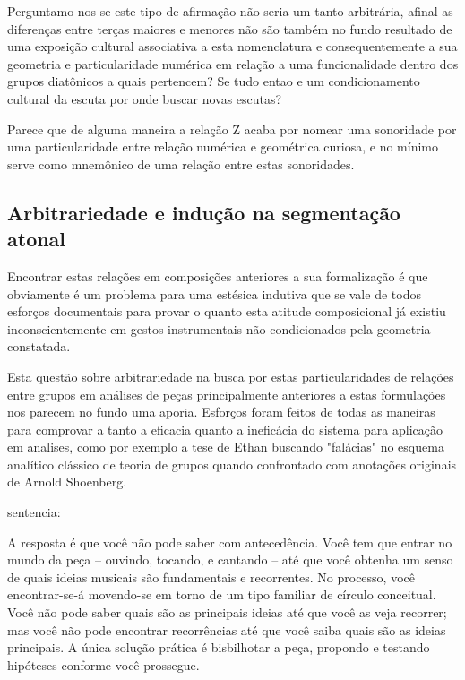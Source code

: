 \documentclass[
	12pt,				%
	openright,			%
	twoside,			%
	a4paper,			%
	english,			%
	french,				%
	spanish,			%
	brazil				%
	]{abntex2}
\begin{document}
Perguntamo-nos se este tipo de afirmação não seria um tanto arbitrária, afinal as diferenças entre terças maiores e menores não são também no fundo resultado de uma exposição cultural associativa a esta nomenclatura e consequentemente a sua geometria e particularidade numérica em relação a uma funcionalidade dentro dos grupos diatônicos a quais pertencem? Se tudo entao e um condicionamento cultural da escuta por onde buscar novas escutas?

Parece que de alguma maneira a relação Z acaba por nomear uma sonoridade por uma particularidade entre relação numérica e geométrica curiosa, e no mínimo serve como mnemônico de uma relação entre estas sonoridades.

\subsection{Arbitrariedade e indução  na segmentação atonal}

Encontrar estas relações em composições anteriores a sua formalização é que obviamente é um problema para uma estésica indutiva\cite{nattiez2001tripartite} que se vale de todos esforços documentais para provar o quanto esta atitude composicional já existiu inconscientemente em gestos instrumentais não condicionados pela geometria constatada.


Esta questão sobre arbitrariedade na busca por estas particularidades de relações entre grupos em análises de peças principalmente anteriores a estas formulações nos parecem no fundo uma aporia. Esforços foram feitos de todas as maneiras para comprovar a tanto a eficacia quanto a ineficácia do sistema para aplicação em analises, como por exemplo a tese de Ethan  buscando "falácias" no esquema analítico clássico de teoria de grupos quando confrontado com anotações originais de Arnold Shoenberg.

 sentencia:

\begin{citacao}
A resposta é que você não pode saber com antecedência.
Você tem que entrar no mundo da peça – ouvindo, tocando, e cantando – até que você
obtenha um senso de quais ideias musicais são fundamentais e recorrentes. No processo,
você encontrar-se-á movendo-se em torno de um tipo familiar de círculo conceitual. Você
não pode saber quais são as principais ideias até que você as veja recorrer; mas você não
pode encontrar recorrências até que você saiba quais são as ideias principais. A única
solução prática é bisbilhotar a peça, propondo e testando hipóteses conforme você
prossegue. 
\cite{straus2004}
\end{citacao}
\end{document}
